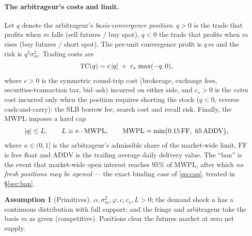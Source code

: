 \documentclass[11pt,a4paper]{article}
\DeclarePairedDelimiter{\abs}{\lvert}{\rvert}
\theoremstyle{plain}
\theoremstyle{definition}
\newtheorem{assumption}{Assumption}
\theoremstyle{remark}
\begin{document}
\paragraph{The arbitrageur's costs and limit.} Let $q$ denote the arbitrageur's \emph{basis-convergence position}: $q>0$ is the trade that profits when $m$ falls (sell futures / buy spot), $q<0$ the trade that profits when $m$ rises (buy futures / short spot). The per-unit convergence profit is $q\,m$ and the risk is $q^2\sigma_m^2$. Trading costs are
\begin{equation}
\mathrm{TC}(q) = c\,\abs{q} \;+\; c_s\,\max(-q,0), \label{eq:tc}
\end{equation}
where $c>0$ is the symmetric round-trip cost (brokerage, exchange fees, securities-transaction tax, bid--ask) incurred on either side, and $c_s>0$ is the \emph{extra} cost incurred only when the position requires shorting the stock ($q<0$, reverse cash-and-carry): the SLB borrow fee, search cost and recall risk. Finally, the MWPL imposes a hard cap
\begin{equation}
\abs{q}\le L, \qquad L \equiv \kappa\cdot \mathrm{MWPL}, \qquad \mathrm{MWPL}=\min\!\big(0.15\,\mathrm{FF},\ 65\,\mathrm{ADDV}\big), \label{eq:cap}
\end{equation}
where $\kappa\in(0,1]$ is the arbitrageur's admissible share of the market-wide limit, $\mathrm{FF}$ is free float and $\mathrm{ADDV}$ is the trailing average daily delivery value. The ``ban'' is the event that market-wide open interest reaches $95\%$ of MWPL, after which \emph{no fresh positions may be opened} --- the exact binding case of \eqref{eq:cap}, treated in \S\ref{sec:ban}.

\begin{assumption}[Primitives]\label{as:prim}
$\alpha,\sigma_m^2,\varphi,c,c_s,L>0$; the demand shock $u$ has a continuous distribution with full support; and the fringe and arbitrageur take the basis $m$ as given (competitive). Positions clear the futures market at zero net supply.
\end{assumption}
\end{document}
